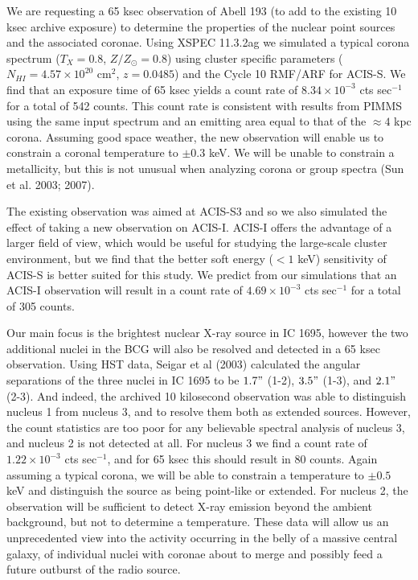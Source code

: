 \documentclass[letterpaper,11pt]{article}
\begin{document}
We are requesting a 65 ksec observation of Abell 193 (to add to 
the existing 10 ksec archive exposure) to determine the properties of
the nuclear point sources and the associated coronae. Using XSPEC
11.3.2ag we simulated a typical corona spectrum ($T_X=0.8$,
$Z/Z_{\odot}=0.8$) using cluster specific parameters
($N_{HI}=4.57\times10^{20}$ cm$^2$, $z=0.0485$) and the Cycle 10
RMF/ARF for ACIS-S. We find that an exposure time of 65 ksec yields a
count rate of $8.34\times10^{-3}$ cts sec$^{-1}$ for a total of 542
counts. This count rate is consistent with results from PIMMS using
the same input spectrum and an emitting area equal to that of the
$\approx4$ kpc corona. Assuming good space weather, the new
observation will enable us to constrain a coronal temperature to
$\pm0.3$ keV. We will be unable to constrain a metallicity, but this
is not unusual when analyzing corona or group spectra (Sun et
al. 2003; 2007).

The existing observation was aimed at ACIS-S3 and so we also simulated
the effect of taking a new observation on ACIS-I. ACIS-I offers the
advantage of a larger field of view, which would be useful for
studying the large-scale cluster environment, but we find that the
better soft energy ($< 1$ keV) sensitivity of ACIS-S is better suited
for this study. We predict from our simulations that an ACIS-I
observation will result in a count rate of $4.69\times10^{-3}$ cts
sec$^{-1}$ for a total of 305 counts.

Our main focus is the brightest nuclear X-ray source in IC 1695,
however the two additional nuclei in the BCG will also be resolved and
detected in a 65 ksec observation. Using HST data, Seigar et al (2003)
calculated the angular separations of the three nuclei in IC 1695 to
be $1.7"$ (1-2), $3.5"$ (1-3), and $2.1"$ (2-3). And indeed, the
archived 10 kilosecond observation was able to distinguish nucleus 1
from nucleus 3, and to resolve them both as extended sources. However,
the count statistics are too poor for any believable spectral analysis
of nucleus 3, and nucleus 2 is not detected at all. For nucleus 3 we
find a count rate of $1.22\times10^{-3}$ cts sec$^{-1}$, and for 65
ksec this should result in 80 counts. Again assuming a typical corona,
we will be able to constrain a temperature to $\pm 0.5$ keV and
distinguish the source as being point-like or extended. For nucleus 2,
the observation will be sufficient to detect X-ray emission beyond the
ambient background, but not to determine a temperature. These data
will allow us an unprecedented view into the activity occurring in the
belly of a massive central galaxy, of individual nuclei with coronae
about to merge and possibly feed a future outburst of the radio
source.
\end{document}
